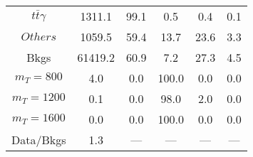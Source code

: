 \begin{figure}
\begin{minipage}[c]{0.32\textwidth}
{\begin{tabular}{cccccc}
$ t\bar{t}\gamma $ &  1311.1 &  99.1 &  0.5 &  0.4 &  0.1\\
$ Others $ &  1059.5 &  59.4 &  13.7 &  23.6 &  3.3\\
Bkgs &  61419.2 &  60.9 &  7.2 &  27.3 &  4.5\\
$ m_{T} = 800 $ &  4.0 &  0.0 &  100.0 &  0.0 &  0.0\\
$ m_{T} = 1200 $ &  0.1 &  0.0 &  98.0 &  2.0 &  0.0\\
$ m_{T} = 1600 $ &  0.0 &  0.0 &  100.0 &  0.0 &  0.0\\
Data/Bkgs &  1.3 &  --- &  --- &  --- &  ---\\
\hline
\end{tabular}
}
\end{minipage}
\end{figure}

